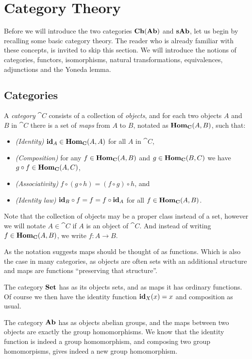 \section{Category Theory}
\label{sec:Category Theory}
Before we will introduce the two categories $\mathbf{Ch}(\mathbf{Ab})$ and $\mathbf{sAb}$, let us begin by recalling some basic category theory. The reader who is already familiar with these concepts, is invited to skip this section. We will introduce the notions of categories, functors, isomorphisms, natural transformations, equivalences, adjunctions and the Yoneda lemma.

\subsection{Categories}
\begin{definition}
	A \emph{category} $\cat{C}$ consists of a collection of \emph{objects}, and for each two objects $A$ and $B$ in $\cat{C}$ there is a set of \emph{maps}  from $A$ to $B$, notated as $\mathbf{Hom}_{\mathbf{C}}(A, B)$, such that:
	\begin{itemize}
		\item \emph{(Identity)}
			$\mathbf{id}_A \in \mathbf{Hom}_{\mathbf{C}}(A, A)$ for all $A$ in $\cat{C}$,
		\item \emph{(Composition)}
			for any $f \in \mathbf{Hom}_{\mathbf{C}}(A, B)$ and $g \in \mathbf{Hom}_{\mathbf{C}}(B, C)$ we have $g \circ f \in \mathbf{Hom}_{\mathbf{C}}(A, C)$,
		\item \emph{(Associativity)}
			$f \circ (g \circ h) = (f \circ g) \circ h$, and
		\item \emph{(Identity law)}
			$\mathbf{id}_B \circ f = f = f \circ \mathbf{id}_A$ for all $f \in \mathbf{Hom}_{\mathbf{C}}(A, B)$.
	\end{itemize}
\end{definition}

Note that the collection of objects may be a proper class instead of a set, however we will notate $A \in \cat{C}$ if $A$ is an object of $\cat{C}$. And instead of writing $f \in \mathbf{Hom}_{\mathbf{C}}(A, B)$, we write $f: A \to B$.

As the notation suggests maps should be thought of as functions. Which is also the case in many categories, as objects are often sets with an additional structure and maps are functions ``preserving that structure''.

\begin{example}
	The category $\mathbf{Set}$ has as its objects sets, and as maps it has ordinary functions. Of course we then have the identity function $\mathbf{id}_X(x) = x$ and composition as usual.
\end{example}
\begin{example}
	The category $\mathbf{Ab}$ has as objects abelian groups, and the maps between two objects are exactly the group homomorphisms. We know that the identity function is indeed a group homomorphism, and composing two group homomorpisms, gives indeed a new group homomorphism.
\end{example}

